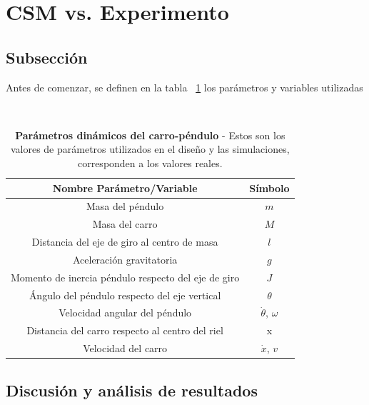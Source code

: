 \section{\textcolor{UNAMblue}{CSM vs. Experimento}}
\subsection{Subsección}
Antes de comenzar, se definen  en la tabla ~\ref{tab:tabla} los parámetros y variables utilizadas

\begin{table}[htp]                             %
\centering\                                     %
\begin{tabular}{||c | c ||}                     %
\hline                                          %
\hline
Nombre Parámetro/Variable & Símbolo\\
\hline
\hline
Masa del péndulo & $m$ \\
\hline
Masa del carro & $M$\\
\hline
Distancia del eje de giro al centro de masa & $l$ \\
\hline
Aceleración gravitatoria & $g$ \\
\hline
Momento de inercia péndulo respecto del eje de giro& $J$ \\
\hline
Ángulo del péndulo respecto del eje vertical & $\theta$\\
\hline
Velocidad angular del péndulo & $\dot{\theta}$, $\omega$\\
\hline
Distancia del carro respecto al centro del riel & x\\
\hline
Velocidad del carro & $\dot{x}$, $v$\\
\hline
\hline
\end{tabular}
\caption[Parámetros dinámicos del carro-péndulo]{\textbf{Parámetros dinámicos del carro-péndulo} - Estos son los valores de parámetros utilizados en el diseño y las simulaciones, corresponden a los valores reales.}
\label{tab:tabla}                              %
\end{table}

\blindtext



\subsection{Discusión y análisis de resultados}

\Blindtext